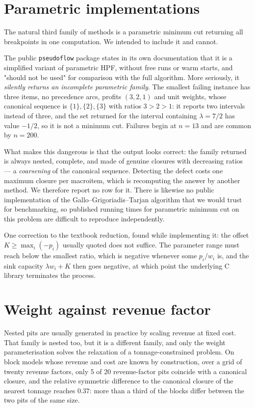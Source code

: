 \documentclass[11pt,a4paper]{article}
\newcommand{\code}[1]{\texttt{#1}}
\begin{document}
\section{Parametric implementations}
\label{sec:parametric}

The natural third family of methods is a parametric minimum cut returning all
breakpoints in one computation. We intended to include it and cannot.

The public \code{pseudoflow} package states in its own documentation that it
is a simplified variant of parametric HPF, without free runs or warm starts,
and "should not be used" for comparison with the full algorithm. More
seriously, it \emph{silently returns an incomplete parametric family}. The
smallest failing instance has three items, no precedence arcs, profits
$(3,2,1)$ and unit weights, whose canonical sequence is
$\{1\},\{2\},\{3\}$ with ratios $3>2>1$: it reports two intervals instead of
three, and the set returned for the interval containing $\lambda=7/2$ has
value $-1/2$, so it is not a minimum cut. Failures begin at $n=13$ and are
common by $n=200$.

What makes this dangerous is that the output looks correct: the family
returned is always nested, complete, and made of genuine closures with
decreasing ratios --- a \emph{coarsening} of the canonical sequence. Detecting
the defect costs one maximum closure per macroitem, which is recomputing the
answer by another method. We therefore report no row for it. There is likewise
no public implementation of the Gallo--Grigoriadis--Tarjan algorithm that we
would trust for benchmarking, so published running times for parametric
minimum cut on this problem are difficult to reproduce independently.

One correction to the textbook reduction, found while implementing it: the
offset $K\ge\max_i(-p_i)$ usually quoted does not suffice. The parameter range
must reach below the smallest ratio, which is negative whenever some
$p_i/w_i$ is, and the sink capacity $\lambda w_i+K$ then goes negative, at
which point the underlying C library terminates the process.

\section{Weight against revenue factor}

Nested pits are usually generated in practice by scaling revenue at fixed
cost. That family is nested too, but it is a different family, and only the
weight parameterisation solves the relaxation of a tonnage-constrained
problem. On block models whose revenue and cost are known by construction,
over a grid of twenty revenue factors, only 5 of 20 revenue-factor pits
coincide with a canonical closure, and the relative symmetric difference to
the canonical closure of the nearest tonnage reaches $0.37$: more than a third
of the blocks differ between the two pits of the same size.
\end{document}

